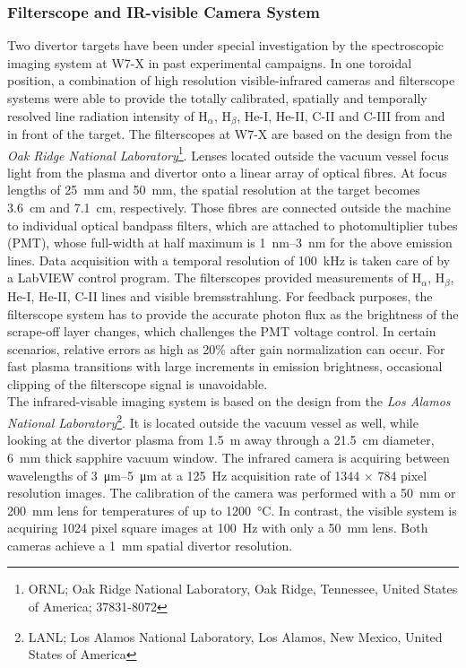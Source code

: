         \subsubsection*{Filterscope and IR-visible Camera System}%
%
            Two divertor targets have been under special investigation by the spectroscopic imaging system at W7-X in past experimental campaigns\cite{Stephey2016}. In one toroidal position, a combination of high resolution visible-infrared cameras and filterscope systems were able to provide the totally calibrated, spatially and temporally resolved line radiation intensity of H$_{\alpha}$, H$_{\beta}$, He-I, He-II, C-II and C-III from and in front of the target. The filterscopes at W7-X are based on the design from the \textit{Oak Ridge National Laboratory}\footnote[1]{ORNL; Oak Ridge National Laboratory, Oak Ridge, Tennessee, United States of America; 37831-8072}. Lenses located outside the vacuum vessel focus light from the plasma and divertor onto a linear array of optical fibres. At focus lengths of \SI{25}{mm} and \SI{50}{\milli\meter}, the spatial resolution at the target becomes \SI{3.6}{\centi\meter} and \SI{7.1}{\centi\meter}, respectively. Those fibres are connected outside the machine to individual optical bandpass filters, which are attached to photomultiplier tubes (PMT), whose full-width at half maximum is \SIrange{1}{3}{\nano\meter} for the above emission lines. Data acquisition with a temporal resolution of \SI{100}{\kilo\hertz} is taken care of by a LabVIEW\textsuperscript{\textregistered} control program. The filterscopes provided measurements of H$_{\alpha}$, H$_{\beta}$, He-I, He-II, C-II lines and visible bremsstrahlung\cite{Stephey2016}. For feedback purposes, the filterscope system has to provide the accurate photon flux as the brightness of the scrape-off layer changes, which challenges the PMT voltage control. In certain scenarios, relative errors as high as 20\% after gain normalization can occur. For fast plasma transitions with large increments in emission brightness, occasional clipping of the filterscope signal is unavoidable\cite{Colchin2003,Brooks2008}.\\%
            The infrared-visable imaging system is based on the design from the \textit{Los Alamos National Laboratory}\footnote[1]{LANL; Los Alamos National Laboratory, Los Alamos, New Mexico, United States of America}. It is located outside the vacuum vessel as well, while looking at the divertor plasma from \SI{1.5}{\meter} away through a \SI{21.5}{\centi\meter} diameter, \SI{6}{\milli\meter} thick sapphire vacuum window. The infrared camera is acquiring between wavelengths of \SIrange{3}{5}{\micro\meter} at a \SI{125}{\hertz} acquisition rate of 1344$\,\times\,$784 pixel resolution images. The calibration of the camera was performed with a \SI{50}{\milli\meter} or \SI{200}{\milli\meter} lens for temperatures of up to \SI{1200}{\celsius}. In contrast, the visible system is acquiring 1024 pixel square images at \SI{100}{\hertz} with only a \SI{50}{\milli\meter} lens. Both cameras achieve a \SI{1}{\milli\meter} spatial divertor resolution\cite{Wurden2016}.\\%
